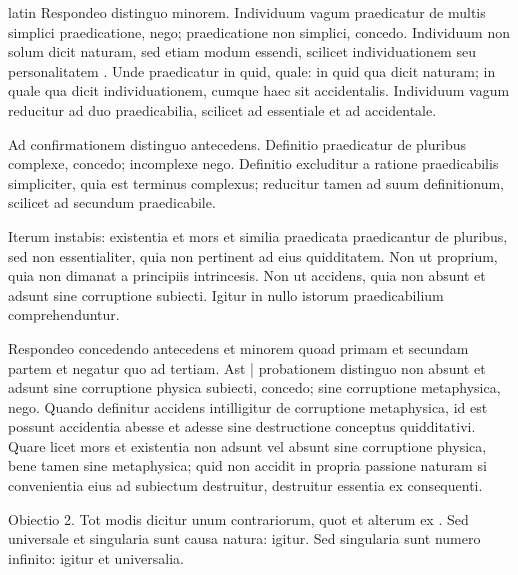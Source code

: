 \begin{otherlanguage*}{latin}
\pstart
Respondeo distinguo minorem. Individuum vagum praedicatur de multis simplici praedicatione, nego; praedicatione non simplici, concedo. Individuum non solum dicit naturam, sed etiam modum essendi, scilicet individuationem seu personalitatem . Unde praedicatur in quid, quale:
in quid qua dicit naturam; in quale qua dicit individuationem, cumque haec sit accidentalis. Individuum vagum reducitur ad duo praedicabilia, scilicet ad essentiale et ad accidentale. 
\pend

\pstart
Ad confirmationem distinguo antecedens. Definitio praedicatur de pluribus complexe, concedo; incomplexe nego. Definitio excluditur a ratione praedicabilis simpliciter, quia est terminus complexus; reducitur tamen ad suum definitionum, scilicet ad secundum praedicabile. 
\pend

\pstart
Iterum instabis:
existentia et mors et similia praedicata praedicantur de pluribus, sed non essentialiter, quia non pertinent ad eius quidditatem. Non ut proprium, quia non dimanat a principiis intrincesis. Non ut accidens, quia non absunt et adsunt sine corruptione subiecti. Igitur in nullo istorum praedicabilium comprehenduntur. 
\pend

\pstart
Respondeo concedendo antecedens et minorem quoad primam et secundam partem et negatur quo ad tertiam. Ast \textnormal{|} probationem distinguo non absunt et adsunt sine corruptione physica subiecti, concedo; sine corruptione metaphysica, nego. Quando definitur accidens intilligitur de corruptione metaphysica, id est possunt accidentia abesse et adesse sine destructione conceptus quidditativi. Quare licet mors et existentia non adsunt vel absunt sine corruptione physica, bene tamen sine metaphysica; quid non accidit in propria passione naturam si convenientia eius ad subiectum destruitur, destruitur essentia ex consequenti. 
\pend

\pstart
Obiectio 2. Tot modis dicitur unum contrariorum, quot et alterum ex . Sed universale et singularia sunt causa natura:
igitur. Sed singularia sunt numero infinito:
igitur et universalia. 
\pend


\end{otherlanguage*}
